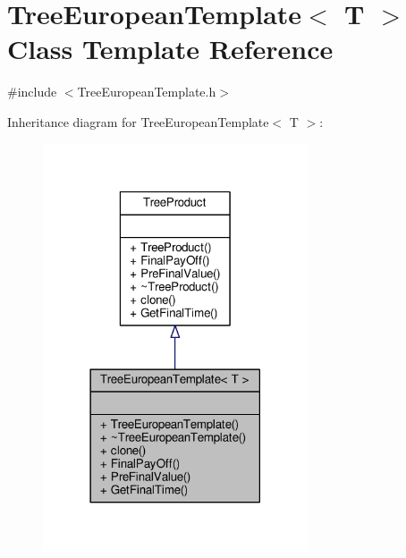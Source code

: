 \hypertarget{classTreeEuropeanTemplate}{}\section{Tree\+European\+Template$<$ T $>$ Class Template Reference}
\label{classTreeEuropeanTemplate}


{\ttfamily \#include $<$Tree\+European\+Template.\+h$>$}



Inheritance diagram for Tree\+European\+Template$<$ T $>$\+:
\nopagebreak
\begin{figure}[H]
\begin{center}
\leavevmode
\includegraphics[width=222pt]{classTreeEuropeanTemplate__inherit__graph}
\end{center}
\end{figure}



